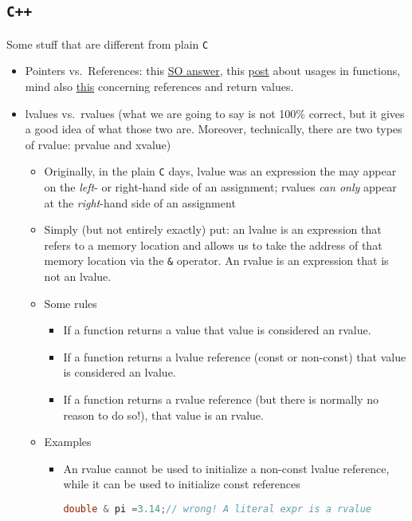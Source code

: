 \documentclass[a4paper,12pt,%
              final%
              ]{article}
\begin{document}
\subsection{\texttt{C++}}
Some stuff that are different from plain \texttt{C}
\begin{itemize}
  \item Pointers vs.\ References: this \href{https://stackoverflow.com/a/57492/12152457}{SO answer}, this \href{https://www.geeksforgeeks.org/when-do-we-pass-arguments-by-reference-or-pointer/}{post} about usages in functions, mind also \href{https://www.tutorialspoint.com/cplusplus/returning_values_by_reference.htm}{this} concerning references and return values.
  \item lvalues vs.\ rvalues (what we are going to say is not 100\% correct, but it gives a good idea of what those two are. Moreover, technically, there are two types of rvalue: prvalue and xvalue)
    \begin{itemize}
      \item Originally, in the plain \texttt{C} days, lvalue was an expression the may appear on the \emph{left}- or right-hand side of an assignment; rvalues \emph{can only} appear at the \emph{right}-hand side of an assignment
      \item Simply (but not entirely exactly) put: an lvalue is an expression that refers to a memory location and allows us to take the address of that memory location via the \verb|&| operator. An rvalue is an expression that is not an lvalue.
      \item Some rules
        \begin{itemize}
          \item If a function returns a value that value is considered an rvalue.
          \item If a function returns a lvalue reference (const or non-const) that value is considered an lvalue.
          \item If a function returns a rvalue reference (but there is normally no reason to do so!), that value is an rvalue.
        \end{itemize}
      \item Examples
        \begin{itemize}
          \item An rvalue cannot be used to initialize a non-const lvalue reference, while it can be used to initialize const references
            \begin{lstlisting}[language=C++]
double & pi =3.14;// wrong! A literal expr is a rvalue

\end{lstlisting}
\end{itemize}
\end{itemize}
\end{itemize}
\end{document}
